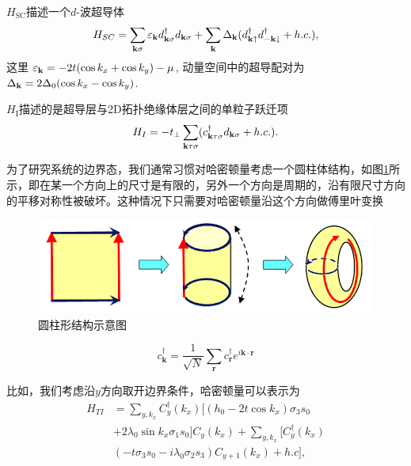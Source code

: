  $H_\mathrm{SC}$描述一个$d$-波超导体
\begin{equation}
H_{SC}=\sum_{{\bf k}\sigma}\varepsilon_{\bf k}d^\dagger_{{\bf k}\sigma}d_{{\bf k}\sigma}+\sum_{{\bf k}}\Delta_{\bf k}(d^\dagger_{{\bf k}\uparrow}d^\dagger_{{-\bf k}\downarrow}+h.c.),
\end{equation}
这里 $\varepsilon_{\bf k}=-2t(\cos k_x+\cos k_y)-\mu$, 动量空间中的超导配对为 $\Delta_{\bf k}=2\Delta_0 (\cos k_x-\cos k_y)$.

$H_\mathrm{I}$描述的是超导层与2D拓扑绝缘体层之间的单粒子跃迁项
\begin{equation}
H_{I}=-t_\perp \sum_{{\bf k}\tau\sigma}(c_{{\bf k}\tau\sigma}^\dagger d_{{\bf k}\sigma}+h.c.).
\end{equation}

 为了研究系统的边界态，我们通常习惯对哈密顿量考虑一个圆柱体结构，如图\ref{fig15}所示，即在某一个方向上的尺寸是有限的，另外一个方向是周期的，沿有限尺寸方向的平移对称性被破坏。这种情况下只需要对哈密顿量沿这个方向做傅里叶变换
\begin{figure}
\centering
\includegraphics[scale=0.6]{pic/fig16}
\caption{圆柱形结构示意图}\label{fig15}
\end{figure}
\begin{equation}
c^\dagger_\mathbf{k}=\frac{1}{\sqrt{N}}\sum_\mathbf{r}c^\dagger_\mathbf{r}e^{i\mathbf{k}\cdot\mathbf{r}}
\end{equation}


 比如，我们考虑沿$y$方向取开边界条件，哈密顿量可以表示为
\begin{equation}
	\begin{aligned}
		H_{TI} &= \sum_{y,k_x}C^\dagger_{y}(k_x)[(h_0-2t\cos k_x)\sigma_3s_0 \\&+2\lambda_0\sin k_x\sigma_1s_0]C_{y}(k_x)
		+\sum_{y,k_x}[C^\dagger_{y}(k_x)\\&(-t\sigma_3s_0-i\lambda_0\sigma_2s_3)C_{y+1}(k_x)+h.c],
	\end{aligned}
\end{equation}


